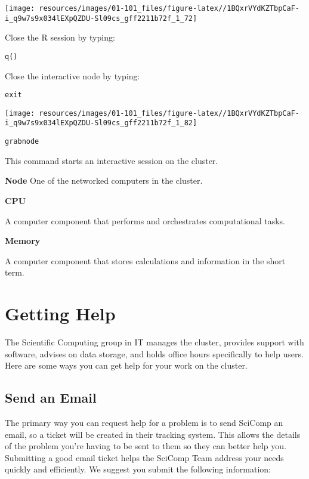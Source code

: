 \documentclass[
]{book}
\begin{document}
\texttt{[image: resources/images/01-101\_files/figure-latex//1BQxrVYdKZTbpCaF-i\_q9w7s9x034lEXpQZDU-Sl09cs\_gff2211b72f\_1\_72]}

Close the R session by typing:

\begin{verbatim}
q()
\end{verbatim}

Close the interactive node by typing:

\begin{verbatim}
exit
\end{verbatim}

\texttt{[image: resources/images/01-101\_files/figure-latex//1BQxrVYdKZTbpCaF-i\_q9w7s9x034lEXpQZDU-Sl09cs\_gff2211b72f\_1\_82]}

\texttt{grabnode}

This command starts an interactive session on the cluster.

\textbf{Node}
One of the networked computers in the cluster.

\textbf{CPU}

A computer component that performs and orchestrates computational tasks.

\textbf{Memory}

A computer component that stores calculations and information in the short term.

\hypertarget{help}{%
\chapter{Getting Help}\label{help}}

The Scientific Computing group in IT manages the cluster, provides support with software, advises on data storage, and holds office hours specifically to help users. Here are some ways you can get help for your work on the cluster.

\hypertarget{send-an-email}{%
\section*{Send an Email}\label{send-an-email}}

The primary way you can request help for a problem is to send SciComp an email, so a ticket will be created in their tracking system. This allows the details of the problem you're having to be sent to them so they can better help you. Submitting a good email ticket helps the SciComp Team address your needs quickly and efficiently. We suggest you submit the following information:
\end{document}
